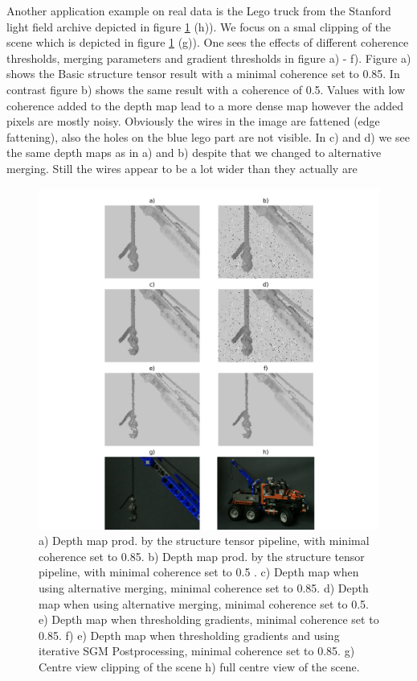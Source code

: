 \documentclass  [
  paper    = a4,
  BCOR     = 10mm,
  twoside,
  fontsize = 12pt,
  fleqn,
  toc      = bibnumbered,
  toc      = listofnumbered,
  numbers  = noendperiod,
  headings = normal,
  listof   = leveldown,
  version  = 3.03
]                                       {scrreprt}
\begin{document}
Another application example on real data is the Lego truck from the Stanford light field archive depicted in figure \ref{fig:truckrealdatasmall} (h)). We focus on a smal clipping of the scene which is depicted in figure \ref{fig:truckrealdatasmall} (g)). One sees the effects of different coherence thresholds, merging parameters and gradient thresholds in figure a) - f). Figure a) shows the Basic structure tensor result with a minimal coherence set to 0.85. In contrast figure b) shows the same result with a coherence of 0.5. Values with low coherence added to the depth map lead to a more dense map however the added pixels are mostly noisy. Obviously the wires in the image are fattened (edge fattening), also the holes on the blue lego part are not visible. In c) and d) we see the same depth maps as in a) and b) despite that we changed to alternative merging. Still the wires appear to be a lot wider than they actually are
\begin{figure}
	\centering
	\includegraphics[width=1\linewidth]{images/truck_realdata_small}
	\caption[Truck with iterative SGM]{a) Depth map prod. by the structure tensor pipeline, with minimal coherence set to 0.85. b) Depth map prod. by the structure tensor pipeline, with minimal coherence set to 0.5 . c) Depth map when using alternative merging, minimal coherence set to 0.85. d) Depth map when using alternative merging, minimal coherence set to 0.5.  e) Depth map when thresholding gradients, minimal coherence set to 0.85. f) e) Depth map when thresholding gradients and using iterative SGM Postprocessing, minimal coherence set to 0.85.  g) Centre view clipping of the scene h) full centre view of the scene.}
	\label{fig:truckrealdatasmall}
\end{figure}
\end{document}
